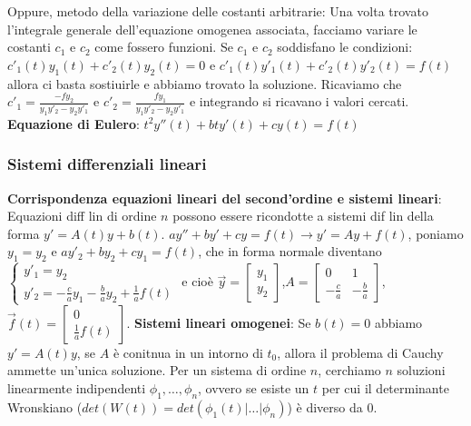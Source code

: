 \documentclass[fontsize=8pt]{scrartcl}
\begin{document}
\begin{multicols*}{4}
Oppure, metodo della variazione delle costanti arbitrarie:\newline
Una volta trovato l'integrale generale dell'equazione omogenea associata, facciamo variare le costanti $c_1$ e $c_2$ come fossero funzioni. Se $c_1$ e $c_2$ soddisfano le condizioni: $c'_1 (t) y_1 (t) + c'_2 (t) y_2(t) = 0$ e $c'_1(t) y'_1(t) + c'_2(t) y'_2(t) = f(t)$ allora ci basta sostiuirle e abbiamo trovato la soluzione. Ricaviamo che $c'_1 = \frac{- f y_2}{y_1y'_2 - y_2y'_1}$ e $c'_2 = \frac{f y_1}{y_1 y'_2 - y_2 y'_1}$ e integrando si ricavano i valori cercati.\newline
\textbf{Equazione di Eulero}:\newline
$t^2 y''(t) + bty'(t) + cy(t) = f(t)$
\subsubsection*{Sistemi differenziali lineari}
\textbf{Corrispondenza equazioni lineari del second'ordine e sistemi lineari}:\newline
Equazioni diff lin di ordine $n$ possono essere ricondotte a sistemi dif lin della forma $y' = A(t) y + b(t)$.\newline
$ay'' + by' + cy = f(t) \rightarrow y' = Ay + f(t)$, poniamo $y_1 = y_2$ e $ay'_2 + by_2 + cy_1 = f(t)$, che in forma normale diventano $\begin{cases}
    y'_1 = y_2 \\
    y'_2 = -\frac{c}{a}y_1 - \frac{b}{a}y_2 + \frac{1}{a} f(t)
\end{cases}$ 
e cioè $\vec{y} = \left[\begin{matrix}
    y_1\\y_2
\end{matrix}\right] $,$ A = \left[\begin{matrix}
    0 & 1  \\ -\frac{c}{a} & - \frac{b}{a}
\end{matrix}\right] $,$ \vec{f}(t) = \left[\begin{matrix}
    0 \\ \frac{1}{a}f(t)
\end{matrix}\right]$. \newline
\textbf{Sistemi lineari omogenei}:\newline
Se $b(t) = 0$ abbiamo $y' = A(t) y$, se $A$ è conitnua in un intorno di $t_0$, allora il problema di Cauchy ammette un'unica soluzione.
Per un sistema di ordine $n$, cerchiamo $n$ soluzioni linearmente indipendenti $\phi_1, \dots, \phi_n$, ovvero se esiste un $t$ per cui il determinante Wronskiano ($det(W(t)) = det(\phi_1(t) | \dots | \phi_n)$) è diverso da $0$.\newline

\end{multicols*}
\end{document}
